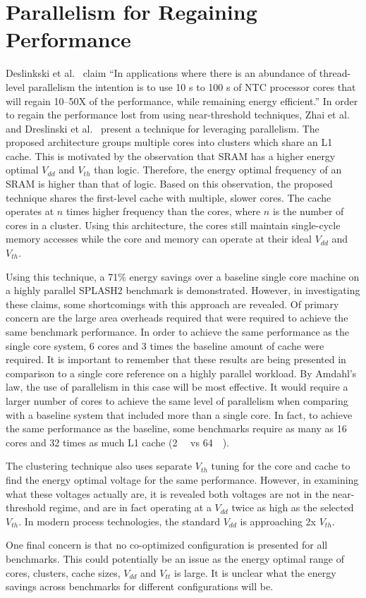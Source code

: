 \section{Parallelism for Regaining Performance}

Deslinkski et al.~\cite{dreslinski2010near} claim ``In applications where there is
an abundance of thread-level parallelism the intention is to use 10 s to 100 s
of NTC processor cores that will regain 10–50X of the performance, while
remaining energy efficient.'' In order to regain the performance lost from using
near-threshold techniques, Zhai et al.~\cite{Zhai:2007kn} and Dreslinski et
al.~\cite{Dreslinski:2007id} present a technique for leveraging parallelism.
The proposed architecture groups multiple cores into clusters which share an L1
cache. This is motivated by the observation that SRAM has a higher energy
optimal $V_{dd}$ and $V_{th}$ than logic. Therefore, the energy optimal
frequency of an SRAM is higher than that of logic. Based on this observation,
the proposed technique shares the first-level cache with multiple, slower cores.
The cache operates at $n$ times higher frequency than the cores, where $n$ is
the number of cores in a cluster.  Using this architecture, the cores still
maintain single-cycle memory accesses while the core and memory can operate at
their ideal $V_{dd}$ and $V_{th}$.

Using this technique, a 71\% energy savings over a baseline single core machine
on a highly parallel SPLASH2 benchmark is demonstrated. However, in
investigating these claims, some shortcomings with this approach are revealed.
Of primary concern are the large area overheads required that were required to
achieve the same benchmark performance. In order to achieve the same
performance as the single core system, 6 cores and 3 times the baseline amount
of cache were required. It is important to remember that these results are
being presented in comparison to a single core reference on a highly parallel
workload. By Amdahl's law, the use of parallelism in this case will be most
effective. It would require a larger number of cores to achieve the same level
of parallelism when comparing with a baseline system that included more than a
single core. In fact, to achieve the same performance as the baseline, some
benchmarks require as many as 16 cores and 32 times as much L1 cache
(\SI{2}{\mega\byte} vs \SI{64}{\kilo\byte}).

The clustering technique also uses separate $V_{th}$ tuning for the core and
cache to find the energy optimal voltage for the same performance. However, in
examining what these voltages actually are, it is revealed both voltages are not
in the near-threshold regime, and are in fact operating at a $V_{dd}$ twice as
high as the selected $V_{th}$. In modern process technologies, the standard
$V_{dd}$ is approaching 2x $V_{th}$.

One final concern is that no co-optimized configuration is presented for all
benchmarks. This could potentially be an issue as the energy optimal range of
cores, clusters, cache sizes, $V_{dd}$ and $V_{tt}$ is large. It is unclear what
the energy savings across benchmarks for different configurations will be.
